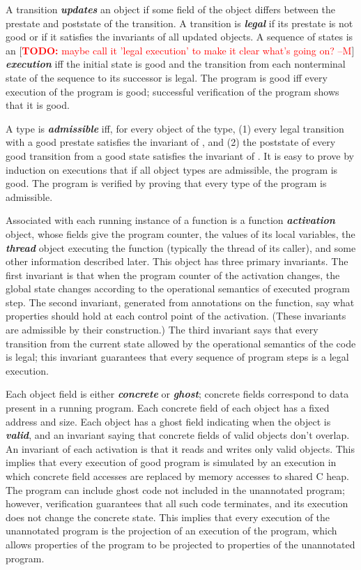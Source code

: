 \documentclass[preprint,nocopyrightspace]{sigplanconf}
\newcommand{\todo}[1]{[\textcolor{red}{\textbf{TODO:} {#1}}]}
\newcommand{\Def}[1]{\textit{\textbf{#1}}}
\begin{document}
A transition \Def{updates} an object if some field of the object differs
between the prestate and poststate of the transition. A transition
is \Def{legal} if its prestate is not good or if it satisfies the
invariants of all updated objects. A sequence of states is an
\todo{maybe call it 'legal execution' to make it clear what's going on? --M}
\Def{execution} iff the initial state
is good and the transition from each nonterminal state of the sequence
to its successor is legal. The program is good iff every execution of
the program is good; successful verification of the program shows that
it is good.

A type is \Def{admissible} iff, for every object  of the type,
(1) every legal transition with a good prestate satisfies the
invariant of , and (2) the poststate of every good transition
from a good state satisfies the invariant of . It is easy to
prove by induction on executions that if all object types are
admissible, the program is good. The program is verified by proving
that every type of the program is admissible.

Associated with each running instance of a function is a
function \Def{activation} object, whose fields give the program
counter, the values of its local variables, the \Def{thread} object
executing the function (typically the thread of its caller), and some
other information described later. This object has three primary
invariants. The first invariant is that when the program counter of
the activation changes, the global state changes according to the
operational semantics of executed program step. The second invariant,
generated from annotations on the function, say what properties should
hold at each control point of the activation.  (These invariants are
admissible by their construction.) The third invariant says that every
transition from the current state allowed by the operational semantics
of the code is legal; this invariant guarantees that every sequence of
program steps is a legal execution.

Each object field is either \Def{concrete} or \Def{ghost}; concrete
fields correspond to data present in a running program. 
Each concrete field of each object has a fixed address and 
size.  Each object has a ghost field indicating when the 
object is \Def{valid}, and an invariant saying that concrete fields
of valid objects don't overlap. An invariant
of each activation is that it reads and writes only valid
objects. This implies that every execution of good program is
simulated by an execution in which concrete field accesses are replaced
by memory accesses to shared C heap. 
The program can include ghost code not included in the unannotated
program; however, verification guarantees that all such code
terminates, and its execution does not change the concrete state. 
This implies that every execution of the unannotated program is 
the projection of an execution of the program, which allows properties
of the program to be projected to properties of the unannotated
program. 
\end{document}
